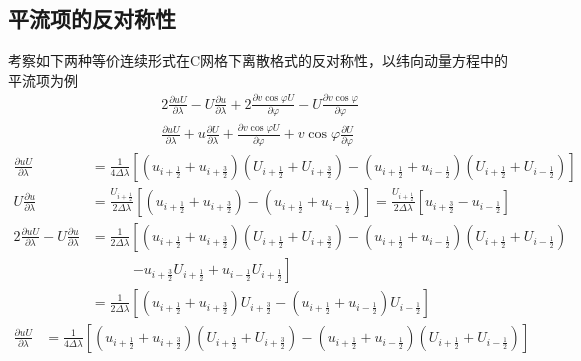 \documentclass{ctexart}
\begin{document}
\begin{appendix}

\section{平流项的反对称性}
\label{app:平流项的反对称性}
考察如下两种等价连续形式在C网格下离散格式的反对称性，以纬向动量方程中的平流项为例
\begin{align}
  2 \frac{\partial u U}{\partial \lambda} - U \frac{\partial u}{\partial \lambda} + 2 \frac{\partial v \cos{\varphi} U}{\partial \varphi} - U \frac{\partial v \cos{\varphi}}{\partial \varphi} \\
  \frac{\partial u U}{\partial \lambda} + u \frac{\partial U}{\partial \lambda} + \frac{\partial v \cos{\varphi} U}{\partial \varphi} + v \cos{\varphi} \frac{\partial U}{\partial \varphi}
\end{align}
\begin{align}
  \frac{\partial u U}{\partial \lambda} & = \frac{1}{4 \Delta{\lambda}} \left[ \left( u_{i+\frac{1}{2}} + u_{i+\frac{3}{2}} \right) \left( U_{i+\frac{1}{2}} + U_{i+\frac{3}{2}} \right) - \left( u_{i+\frac{1}{2}} + u_{i-\frac{1}{2}} \right) \left( U_{i+\frac{1}{2}} + U_{i-\frac{1}{2}} \right) \right] \nonumber \\
  U \frac{\partial u}{\partial \lambda} & = \frac{U_{i+\frac{1}{2}}}{2 \Delta{\lambda}} \left[ \left( u_{i+\frac{1}{2}} + u_{i+\frac{3}{2}} \right) - \left( u_{i+\frac{1}{2}} + u_{i-\frac{1}{2}} \right) \right] = \frac{U_{i+\frac{1}{2}}}{2 \Delta{\lambda}} \left[ u_{i+\frac{3}{2}} - u_{i-\frac{1}{2}} \right] \nonumber \\
  2 \frac{\partial u U}{\partial \lambda} - U \frac{\partial u}{\partial \lambda} & = \frac{1}{2 \Delta{\lambda}} \left[ \left( u_{i+\frac{1}{2}} + u_{i+\frac{3}{2}} \right) \left( U_{i+\frac{1}{2}} + U_{i+\frac{3}{2}} \right) - \left( u_{i+\frac{1}{2}} + u_{i-\frac{1}{2}} \right) \left( U_{i+\frac{1}{2}} + U_{i-\frac{1}{2}} \right) \right. \nonumber \\
  & \quad\quad\quad \left. - u_{i+\frac{3}{2}} U_{i+\frac{1}{2}} + u_{i-\frac{1}{2}} U_{i+\frac{1}{2}} \right] \nonumber \\
  & = \frac{1}{2 \Delta{\lambda}} \left[ \left( u_{i+\frac{1}{2}} + u_{i+\frac{3}{2}} \right) U_{i+\frac{3}{2}} - \left( u_{i+\frac{1}{2}} + u_{i-\frac{1}{2}} \right) U_{i-\frac{1}{2}} \right] \label{eqn:平流项第一种形式离散格式}
\end{align}
\begin{align}
  \frac{\partial u U}{\partial \lambda} & = \frac{1}{4 \Delta{\lambda}} \left[ \left( u_{i+\frac{1}{2}} + u_{i+\frac{3}{2}} \right) \left( U_{i+\frac{1}{2}} + U_{i+\frac{3}{2}} \right) - \left( u_{i+\frac{1}{2}} + u_{i-\frac{1}{2}} \right) \left( U_{i+\frac{1}{2}} + U_{i-\frac{1}{2}} \right) \right] \nonumber \\

\end{align}
\end{appendix}
\end{document}
